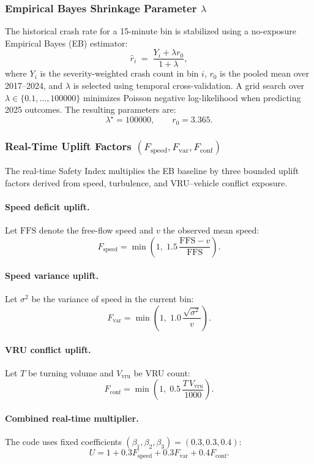 \documentclass[conference]{IEEEtran}
\begin{document}
\subsubsection{Empirical Bayes Shrinkage Parameter $\lambda$}
The historical crash rate for a 15-minute bin is stabilized using a no-exposure 
Empirical Bayes (EB) estimator:
\[
\hat r_i \;=\;
\frac{Y_i + \lambda r_0}{1+\lambda},
\]
where $Y_i$ is the severity-weighted crash count in bin $i$, $r_0$ is the pooled 
mean over 2017--2024, and $\lambda$ is selected using temporal cross-validation.
A grid search over $\lambda\in\{0.1,\ldots,100000\}$ minimizes Poisson negative 
log-likelihood when predicting 2025 outcomes.  
The resulting parameters are:
\[
\lambda^\star = 100000,\qquad r_0 = 3.365.
\]

\subsubsection{Real-Time Uplift Factors $(F_{\text{speed}},F_{\text{var}},F_{\text{conf}})$}
The real-time Safety Index multiplies the EB baseline by three bounded uplift 
factors derived from speed, turbulence, and VRU--vehicle conflict exposure.

\paragraph{Speed deficit uplift.}
Let $\mathrm{FFS}$ denote the free-flow speed and $v$ the observed mean speed:
\[
F_{\text{speed}}
=
\min\!\left(1,\;
1.5\,\frac{\mathrm{FFS}-v}{\mathrm{FFS}}
\right).
\]

\paragraph{Speed variance uplift.}
Let $\sigma^2$ be the variance of speed in the current bin:
\[
F_{\text{var}}
=
\min\!\left(1,\;
1.0\,\frac{\sqrt{\sigma^2}}{v}
\right).
\]

\paragraph{VRU conflict uplift.}
Let $T$ be turning volume and $V_{\mathrm{vru}}$ be VRU count:
\[
F_{\text{conf}}
=
\min\!\left(1,\;
0.5\,\frac{T\,V_{\mathrm{vru}}}{1000}
\right).
\]

\paragraph{Combined real-time multiplier.}
The code uses fixed coefficients $(\beta_1,\beta_2,\beta_3)=(0.3,0.3,0.4)$:
\[
U
=
1
+
0.3F_{\text{speed}}
+
0.3F_{\text{var}}
+
0.4F_{\text{conf}}.
\]
\end{document}

